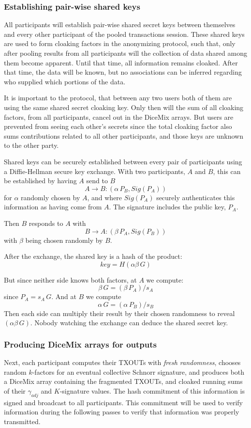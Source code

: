 \documentclass[a4paper, 10pt, conference]{ieeeconf}
\begin{document}
\subsubsection{Establishing pair-wise shared keys} 
All participants will establish pair-wise shared secret keys between themselves and every other participant of the pooled transactions session. These shared keys are used to form cloaking factors in the anonymizing protocol, such that, only after pooling results from all participants will the collection of data shared among them become apparent. Until that time, all information remains cloaked. After that time, the data will be known, but no associations can be inferred regarding who supplied which portions of the data. 

It is important to the protocol, that between any two users both of them are using the same shared secret cloaking key. Only then will the sum of all cloaking factors, from all participants, cancel out in the DiceMix arrays. But users are prevented from seeing each other's secrets since the total cloaking factor also sums contributions related to all other participants, and those keys are unknown to the other party.

Shared keys can be securely established between every pair of participants using a Diffie-Hellman secure key exchange\cite{c21}. With two participants, $A$ and $B$, this can be established by having $A$ send to $B$
$$A \rightarrow B: (\alpha \, P_B, Sig(P_A))$$
for $\alpha$ randomly chosen by $A$, and where $Sig(P_A)$ securely authenticates this information as having come from $A$. The signature includes the public key, $P_A$. 

Then $B$ responds to $A$ with
$$B \rightarrow A: (\beta \, P_A, Sig(P_B))$$
with $\beta$ being chosen randomly by $B$. 

After the exchange, the shared key is a hash of the product:
$$key = H(\alpha \beta \, G)$$ 

But since neither side knows both factors, at $A$ we compute:
$$\beta \, G = (\beta \, P_A) / s_A$$
since $P_A = s_A \, G$. And at $B$ we compute
$$\alpha \, G = (\alpha \, P_B) / s_B$$
Then each side can multiply their result by their chosen randomness to reveal $(\alpha \beta \, G)$. Nobody watching the exchange can deduce the shared secret key.

\subsubsection{Producing DiceMix arrays for outputs} 
Next, each participant computes their TXOUTs with \textit{fresh randomness}, chooses random $k$-factors for an eventual collective Schnorr signature, and produces both a DiceMix array containing the fragmented TXOUTs, and cloaked running sums of their $\gamma_{adj}$ and $K$-signature values. The hash commitment of this information is signed and broadcast to all participants. This commitment will be used to verify information during the following passes to verify that information was properly transmitted.
\end{document}
